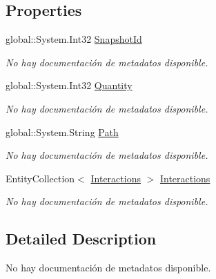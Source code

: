 \subsection*{Properties}
\begin{DoxyCompactItemize}
\item 
global\-::\-System.\-Int32 \hyperlink{class_microsoft_1_1_samples_1_1_kinect_1_1_basic_interactions_1_1_snapshots_a38e656a5d81702b34a246c5439e5cd59}{Snapshot\-Id}
\begin{DoxyCompactList}\small\item\em No hay documentación de metadatos disponible. \end{DoxyCompactList}\item 
global\-::\-System.\-Int32 \hyperlink{class_microsoft_1_1_samples_1_1_kinect_1_1_basic_interactions_1_1_snapshots_aec5d2c578d98d9e8a2e0d2c73298c416}{Quantity}
\begin{DoxyCompactList}\small\item\em No hay documentación de metadatos disponible. \end{DoxyCompactList}\item 
global\-::\-System.\-String \hyperlink{class_microsoft_1_1_samples_1_1_kinect_1_1_basic_interactions_1_1_snapshots_a8e2d057bb4319f91a172cf43d9160a1b}{Path}
\begin{DoxyCompactList}\small\item\em No hay documentación de metadatos disponible. \end{DoxyCompactList}\item 
Entity\-Collection$<$ \hyperlink{class_microsoft_1_1_samples_1_1_kinect_1_1_basic_interactions_1_1_interactions}{Interactions} $>$ \hyperlink{class_microsoft_1_1_samples_1_1_kinect_1_1_basic_interactions_1_1_snapshots_aeafaf65c4f8c7d9106cde5fd43ccd269}{Interactions}
\begin{DoxyCompactList}\small\item\em No hay documentación de metadatos disponible. \end{DoxyCompactList}\end{DoxyCompactItemize}


\subsection{Detailed Description}
No hay documentación de metadatos disponible. 




